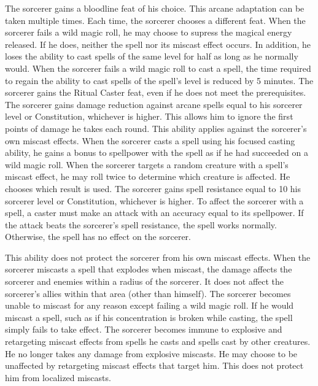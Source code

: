 The sorcerer gains a bloodline feat of his choice.
This arcane adaptation can be taken multiple times.
Each time, the sorcerer chooses a different feat.
When the sorcerer fails a wild magic roll, he may choose to supress the magical energy released.
If he does, neither the spell nor its miscast effect occurs.
In addition, he loses the ability to cast spells of the same level for half as long as he normally would.
When the sorcerer fails a wild magic roll to cast a spell, the time required to regain the ability to cast spells of the spell's level is reduced by 5 minutes.
The sorcerer gains the Ritual Caster feat, even if he does not meet the prerequisites.
The sorcerer gains damage reduction against arcane spells equal to his sorcerer level or Constitution, whichever is higher.
This allows him to ignore the first points of damage he takes each round.
This ability applies against the sorcerer's own miscast effects.
When the sorcerer casts a spell using his focused casting ability, he gains a bonus to spellpower with the spell as if he had succeeded on a wild magic roll.
When the sorcerer targets a random creature with a spell's miscast effect, he may roll twice to determine which creature is affected.
He chooses which result is used.
The sorcerer gains spell resistance equal to 10 \add his sorcerer level or Constitution, whichever is higher.
To affect the sorcerer with a spell, a caster must make an attack with an accuracy equal to its spellpower.
If the attack beats the sorcerer's spell resistance, the spell works normally.
Otherwise, the spell has no effect on the sorcerer.

This ability does not protect the sorcerer from his own miscast effects.
When the sorcerer miscasts a spell that explodes when miscast, the damage affects the sorcerer and enemies within a \areasmall radius of the sorcerer.
It does not affect the sorcerer's allies within that area (other than himself).
The sorcerer becomes unable to miscast for any reason except failing a wild magic roll.
If he would miscast a spell, such as if his concentration is broken while casting, the spell simply fails to take effect.
The sorcerer becomes immune to explosive and retargeting miscast effects from spells he casts and spells cast by other creatures.
He no longer takes any damage from explosive miscasts.
He may choose to be unaffected by retargeting miscast effects that target him.
This does not protect him from localized miscasts.

